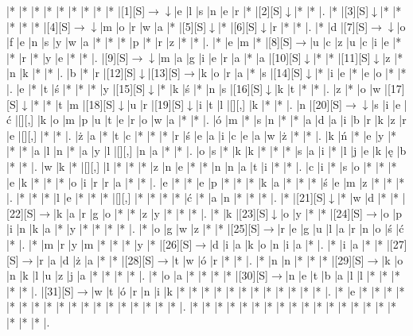 \documentclass[11pt]{article}
\newcommand\drarr{$\rightarrow \!\!\!\!\! \downarrow$}
\newcommand\rarr{$\rightarrow$}
\newcommand\darr{$\downarrow$}
\begin{document}
\noindent\begin{Puzzle}{19}{26}|*	|*	|*	|*	|*	|*	|*	|*	|*	|[1][S]\drarr	|e	|l	|s	|n	|e	|r	|*	|[2][S]\darr	|*	|*	|.
|*	|[3][S]\darr	|*	|*	|*	|*	|*	|[4][S]\drarr	|m	|o	|r	|w	|a	|*	|[5][S]\darr	|*	|[6][S]\darr	|r	|*	|*	|.
|*	|d	|[7][S]\drarr	|o	|f	|e	|n	|s	|y	|w	|a	|*	|*	|*	|p	|*	|r	|z	|*	|*	|.
|*	|e	|m	|*	|[8][S]\rarr	|u	|c	|z	|u	|c	|i	|e	|*	|*	|r	|*	|y	|e	|*	|*	|.
|[9][S]\drarr	|m	|a	|g	|i	|e	|r	|a	|*	|a	|[10][S]\darr	|*	|*	|[11][S]\darr	|z	|*	|n	|k	|*	|*	|.
|b	|*	|r	|[12][S]\darr	|[13][S]\rarr	|k	|o	|r	|a	|*	|s	|[14][S]\darr	|*	|i	|e	|*	|e	|o	|*	|*	|.
|e	|*	|t	|ś	|*	|*	|*	|y	|[15][S]\darr	|*	|k	|ś	|*	|n	|s	|[16][S]\darr	|k	|t	|*	|*	|.
|z	|*	|o	|w	|[17][S]\darr	|*	|*	|t	|m	|[18][S]\darr	|u	|r	|[19][S]\darr	|i	|t	|l	|[][,]{ }	|k	|*	|*	|.
|n	|[20][S]\drarr	|s	|i	|e	|ć	|[][,]{ }	|k	|o	|m	|p	|u	|t	|e	|r	|o	|w	|a	|*	|*	|.
|ó	|m	|*	|s	|n	|*	|*	|a	|d	|a	|i	|b	|r	|k	|z	|r	|e	|[][,]{ }	|*	|*	|.
|ż	|a	|*	|t	|c	|*	|*	|*	|r	|ś	|e	|a	|i	|c	|e	|a	|w	|ż	|*	|*	|.
|k	|ń	|*	|e	|y	|*	|*	|*	|a	|l	|n	|*	|a	|y	|l	|[][,]{ }	|n	|a	|*	|*	|.
|o	|s	|*	|k	|k	|*	|*	|*	|s	|a	|i	|*	|l	|j	|e	|k	|ę	|b	|*	|*	|.
|w	|k	|*	|[][,]{ }	|l	|*	|*	|*	|z	|n	|e	|*	|*	|n	|n	|a	|t	|i	|*	|*	|.
|c	|i	|*	|s	|o	|*	|*	|*	|e	|k	|*	|*	|*	|o	|i	|r	|r	|a	|*	|*	|.
|e	|*	|*	|e	|p	|*	|*	|*	|k	|a	|*	|*	|*	|ś	|e	|m	|z	|*	|*	|*	|.
|*	|*	|*	|l	|e	|*	|*	|*	|[][,]{ }	|*	|*	|*	|*	|ć	|*	|a	|n	|*	|*	|*	|.
|*	|[21][S]\darr	|*	|w	|d	|*	|*	|[22][S]\rarr	|k	|a	|r	|g	|o	|*	|*	|z	|y	|*	|*	|*	|.
|*	|k	|[23][S]\darr	|o	|y	|*	|*	|[24][S]\rarr	|o	|p	|i	|n	|k	|a	|*	|y	|*	|*	|*	|*	|.
|*	|o	|g	|w	|z	|*	|*	|[25][S]\rarr	|r	|e	|g	|u	|l	|a	|r	|n	|o	|ś	|ć	|*	|.
|*	|m	|r	|y	|m	|*	|*	|*	|y	|*	|[26][S]\rarr	|d	|i	|a	|k	|o	|n	|i	|a	|*	|.
|*	|i	|a	|*	|*	|[27][S]\rarr	|r	|a	|d	|ż	|a	|*	|*	|[28][S]\rarr	|t	|w	|ó	|r	|*	|*	|.
|*	|n	|n	|*	|*	|*	|[29][S]\rarr	|k	|o	|n	|k	|l	|u	|z	|j	|a	|*	|*	|*	|*	|.
|*	|o	|a	|*	|*	|*	|*	|[30][S]\rarr	|n	|e	|t	|b	|a	|l	|l	|*	|*	|*	|*	|*	|.
|[31][S]\rarr	|w	|t	|ó	|r	|n	|i	|k	|*	|*	|*	|*	|*	|*	|*	|*	|*	|*	|*	|*	|.
|*	|e	|*	|*	|*	|*	|*	|*	|*	|*	|*	|*	|*	|*	|*	|*	|*	|*	|*	|*	|.
|*	|*	|*	|*	|*	|*	|*	|*	|*	|*	|*	|*	|*	|*	|*	|*	|*	|*	|*	|*	|.\end{Puzzle}

\newpage
\end{document}
